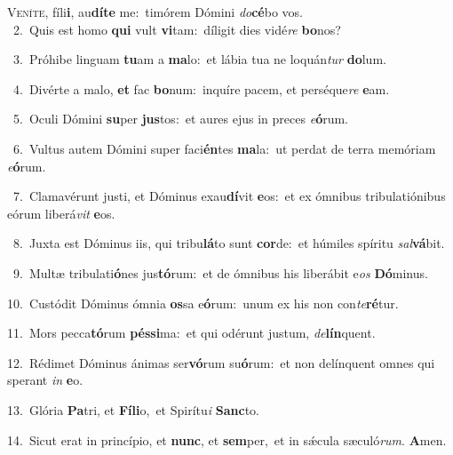 \lettrine{\initial\textcolor{\initialcolor}{V}}{eníte,} fíli\-\textbf{i}\-, au\-\textbf{dí}\-\textbf{te} me:~\star timórem Dómini \textit{do}\-\textbf{cé}bo vos.\\
{\numbfont\textcolor{\numbcolor}{~2.}}~Quis est homo \textbf{qui} vult \textbf{vi}\-tam:~\star díligit dies vidé\textit{re} \textbf{bo}\-nos?\par
{\numbfont\textcolor{\numbcolor}{~3.}}~Próhibe linguam \textbf{tu}\-am a \textbf{ma}\-lo:~\star et lábia tua ne loquán\textit{tur} \textbf{do}\-lum.\par
{\numbfont\textcolor{\numbcolor}{~4.}}~Divérte a malo, \textbf{et} fac \textbf{bo}\-num:~\star inquíre pacem, et perséque\textit{re} \textbf{e}\-am.\par
{\numbfont\textcolor{\numbcolor}{~5.}}~Oculi Dómini \textbf{su}\-per \textbf{jus}\-tos:~\star et aures ejus in preces \textit{e}\-\textbf{ó}rum.\par
{\numbfont\textcolor{\numbcolor}{~6.}}~Vultus autem Dómini super faci\-\textbf{én}\-tes \textbf{ma}\-la:~\star ut perdat de terra memóriam \textit{e}\-\textbf{ó}rum.\par
{\numbfont\textcolor{\numbcolor}{~7.}}~Clamavérunt justi, et Dóminus exau\-\textbf{dí}\-vit \textbf{e}\-os:~\star et ex ómnibus tribulatiónibus eórum liberá\textit{vit} \textbf{e}\-os.\par
{\numbfont\textcolor{\numbcolor}{~8.}}~Juxta est Dóminus iis, qui tribu\-\textbf{lá}\-to sunt \textbf{cor}\-de:~\star et húmiles spíritu \textit{sal}\-\textbf{vá}bit.\par
{\numbfont\textcolor{\numbcolor}{~9.}}~Multæ tribulati\-\textbf{ó}\-nes jus\-\textbf{tó}\-rum:~\star et de ómnibus his liberábit e\textit{os} \textbf{Dó}\-minus.\par
{\numbfont\textcolor{\numbcolor}{10.}}~Custódit Dóminus ómnia \textbf{os}\-sa e\-\textbf{ó}\-rum:~\star unum ex his non con\-\textit{te}\-\textbf{ré}tur.\par
{\numbfont\textcolor{\numbcolor}{11.}}~Mors pecca\-\textbf{tó}\-rum \textbf{pés}\-\textbf{si}ma:~\star et qui odérunt justum, \textit{de}\-\textbf{lín}quent.\par
{\numbfont\textcolor{\numbcolor}{12.}}~Rédimet Dóminus ánimas ser\-\textbf{vó}\-rum su\-\textbf{ó}\-rum:~\star et non delínquent omnes qui sperant \textit{in} \textbf{e}\-o.\par
{\numbfont\textcolor{\numbcolor}{13.}}~Glória \textbf{Pa}\-tri, et \textbf{Fí}\-\textbf{li}o,~\star et Spirítu\textit{i} \textbf{Sanc}\-to.\par
{\numbfont\textcolor{\numbcolor}{14.}}~Sicut erat in princípio, et \textbf{nunc}\-, et \textbf{sem}\-per,~\star et in sǽcula sæculó\-\textit{rum}\-. \textbf{A}\-men.\par
